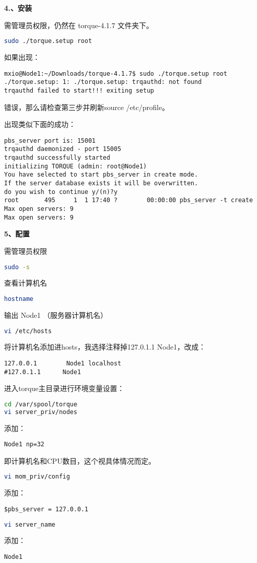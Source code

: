 {\textbf{4.、安装}

需管理员权限，仍然在 torque-4.1.7 文件夹下。
\begin{lstlisting}[language=sh]
sudo ./torque.setup root
\end{lstlisting}
如果出现：
\begin{verbatim}
mxio@Node1:~/Downloads/torque-4.1.7$ sudo ./torque.setup root
./torque.setup: 1: ./torque.setup: trqauthd: not found
trqauthd failed to start!!! exiting setup 
\end{verbatim}
错误，那么请检查第三步并刷新source /etc/profile。

出现类似下面的成功：
\begin{verbatim}
pbs_server port is: 15001
trqauthd daemonized - port 15005
trqauthd successfully started
initializing TORQUE (admin: root@Node1)
You have selected to start pbs_server in create mode.
If the server database exists it will be overwritten.
do you wish to continue y/(n)?y
root       495     1  1 17:40 ?        00:00:00 pbs_server -t create
Max open servers: 9
Max open servers: 9
\end{verbatim}


\textbf{5、配置}

需管理员权限
\begin{lstlisting}[language=sh]
sudo -s
\end{lstlisting}
查看计算机名
\begin{lstlisting}[language=sh]
hostname
\end{lstlisting}
输出 Node1 （服务器计算机名）
\begin{lstlisting}[language=sh]
vi /etc/hosts
\end{lstlisting}
 将计算机名添加进hosts，我选择注释掉127.0.1.1 Node1，改成：
 \begin{verbatim}
127.0.0.1        Node1 localhost
#127.0.1.1      Node1
\end{verbatim}
进入torque主目录进行环境变量设置：
\begin{lstlisting}[language=sh]
cd /var/spool/torque
vi server_priv/nodes
\end{lstlisting}
添加：
 \begin{verbatim}
Node1 np=32
\end{verbatim}
即计算机名和CPU数目，这个视具体情况而定。
\begin{lstlisting}[language=sh]
vi mom_priv/config
\end{lstlisting}
添加：
\begin{verbatim}
$pbs_server = 127.0.0.1
\end{verbatim}
\begin{lstlisting}[language=sh]
vi server_name
\end{lstlisting}
添加：
\begin{verbatim}
Node1
\end{verbatim}


}
